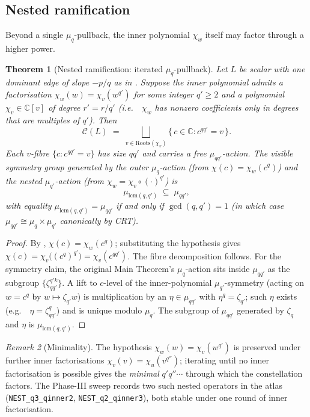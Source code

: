 \documentclass[11pt,a4paper]{article}
\theoremstyle{plain}
\newtheorem{theorem}{Theorem}[section]
\theoremstyle{definition}
\theoremstyle{remark}
\newtheorem{remark}[theorem]{Remark}
\newcommand{\Roots}{\mathrm{Roots}}
\newcommand{\Cl}{\mathcal{C}}
\newcommand{\ie}{i.e.\ }
\newcommand{\eg}{e.g.\ }
\begin{document}
\subsection{Nested ramification}\label{ssec:N1}

Beyond a single $\mu_q$-pullback, the inner polynomial $\chi_w$ itself
may factor through a higher power.

\begin{theorem}[Nested ramification: iterated $\mu_q$-pullback]\label{thm:N1}
Let $L$ be scalar with one dominant edge of slope $-p/q$ as in
. Suppose the inner polynomial admits a factorisation
$\chi_w(w) = \chi_v(w^{q'})$ for some integer $q' \ge 2$ and a polynomial
$\chi_v \in \mathbb{C}[v]$ of degree $r' = r / q'$ (\ie\ $\chi_w$ has
nonzero coefficients only in degrees that are multiples of $q'$). Then
\[
   \Cl(L) \;=\; \bigsqcup_{v \in \Roots(\chi_v)}
            \big\{\, c \in \mathbb{C} : c^{qq'} = v \,\big\}.
\]
Each $v$-fibre $\{c : c^{qq'} = v\}$ has size $qq'$ and carries a free
$\mu_{qq'}$-action. The \emph{visible} symmetry group generated by the
outer $\mu_q$-action (from $\chi(c) = \chi_w(c^q)$) and the nested
$\mu_{q'}$-action (from $\chi_w = \chi_v \circ (\cdot)^{q'}$) is
\[
   \mu_{\mathrm{lcm}(q, q')} \;\subseteq\; \mu_{qq'},
\]
with equality $\mu_{\mathrm{lcm}(q, q')} = \mu_{qq'}$ if and only if
$\gcd(q, q') = 1$ (in which case $\mu_{qq'} \cong \mu_q \times \mu_{q'}$
canonically by CRT).
\end{theorem}

\begin{proof}
By , $\chi(c) = \chi_w(c^q)$; substituting the hypothesis
gives $\chi(c) = \chi_v\big((c^q)^{q'}\big) = \chi_v(c^{qq'})$. The fibre
decomposition follows. For the symmetry claim, the original Main
Theorem's $\mu_q$-action sits inside $\mu_{qq'}$ as the subgroup
$\{\zeta_{qq'}^{q' k}\}$. A lift to $c$-level of the inner-polynomial
$\mu_{q'}$-symmetry (acting on $w = c^q$ by $w \mapsto \zeta_{q'} w$) is
multiplication by an $\eta \in \mu_{qq'}$ with $\eta^q = \zeta_{q'}$;
such $\eta$ exists (\eg\ $\eta = \zeta_{qq'}^q$) and is unique modulo
$\mu_q$. The subgroup of $\mu_{qq'}$ generated by $\zeta_q$ and $\eta$
is $\mu_{\mathrm{lcm}(q, q')}$.
\end{proof}

\begin{remark}[Minimality]\label{rem:N1-min}
The hypothesis $\chi_w(w) = \chi_v(w^{q'})$ is preserved under further
inner factorisations $\chi_v(v) = \chi_u(v^{q''})$; iterating until no
inner factorisation is possible gives the \emph{minimal} $q' q'' \cdots$
through which the constellation factors. The Phase-III sweep records two
such nested operators in the atlas (\texttt{NEST\_q3\_qinner2},
\texttt{NEST\_q2\_qinner3}), both stable under one round of inner
factorisation.
\end{remark}
\end{document}
